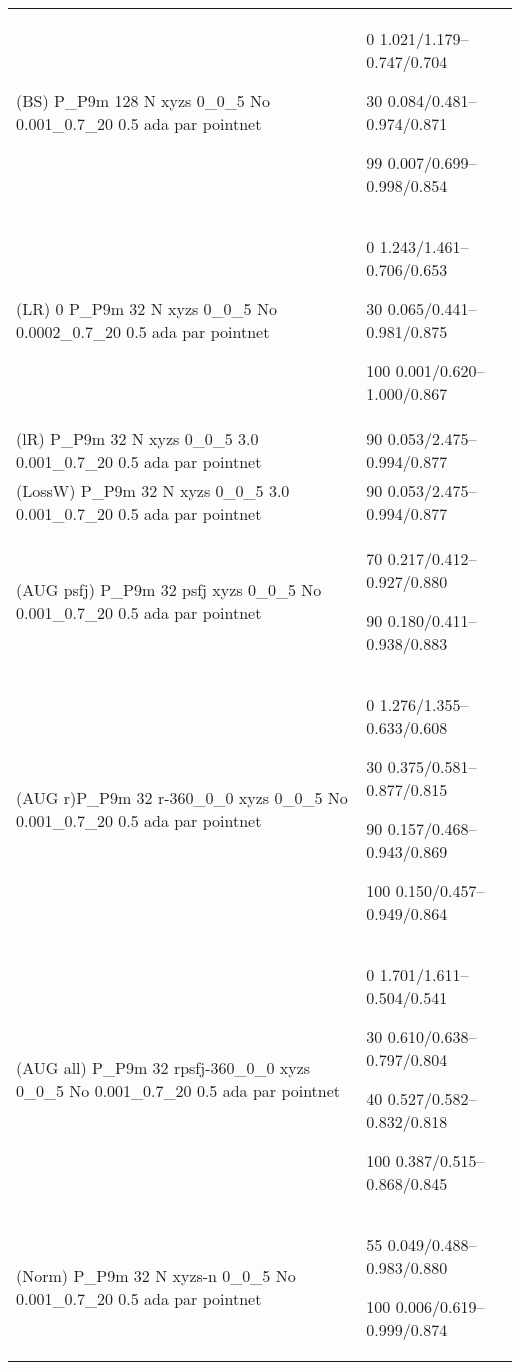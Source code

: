 \documentclass[,table,dvipsnames]{article}
\begin{document}
\begin{tabular}{|p{10cm}|p{5.5cm}| }
\rowcolor{red!20}
(BS)  P\_P9m 128 N xyzs 0\_0\_5 No 0.001\_0.7\_20 0.5 ada par pointnet& 0 1.021/1.179--0.747/0.704\par 30 0.084/0.481--0.974/0.871\par 99 0.007/0.699--0.998/0.854\\

\rowcolor{green!20}
(LR) 0 P\_P9m 32 N xyzs 0\_0\_5 No 0.0002\_0.7\_20 0.5 ada par pointnet& 0 1.243/1.461--0.706/0.653\par 30 0.065/0.441--0.981/0.875\par 100 0.001/0.620--1.000/0.867 \\

\rowcolor{red!20}
(lR) P\_P9m 32 N xyzs 0\_0\_5 3.0 0.001\_0.7\_20 0.5 ada par pointnet& 90 0.053/2.475--0.994/0.877\\

\rowcolor{green!20}
(LossW) P\_P9m 32 N xyzs 0\_0\_5 3.0 0.001\_0.7\_20 0.5 ada par pointnet& 90 0.053/2.475--0.994/0.877\\

\rowcolor{red!20}
(AUG psfj) P\_P9m 32 psfj xyzs 0\_0\_5 No 0.001\_0.7\_20 0.5 ada par pointnet& 70 0.217/0.412--0.927/0.880\par 90 0.180/0.411--0.938/0.883\\

\rowcolor{green!20}
(AUG r)P\_P9m 32 r-360\_0\_0 xyzs 0\_0\_5 No 0.001\_0.7\_20 0.5 ada par pointnet & 0 1.276/1.355--0.633/0.608\par 30 0.375/0.581--0.877/0.815 \par 90 0.157/0.468--0.943/0.869\par 100 0.150/0.457--0.949/0.864\\

\rowcolor{red!20}
(AUG all)  P\_P9m 32 rpsfj-360\_0\_0 xyzs 0\_0\_5 No 0.001\_0.7\_20 0.5 ada par pointnet& 0 1.701/1.611--0.504/0.541\par 30 0.610/0.638--0.797/0.804\par 40 0.527/0.582--0.832/0.818\par 100 0.387/0.515--0.868/0.845\\

\rowcolor{green!20}
(Norm) P\_P9m 32 N xyzs-n 0\_0\_5 No 0.001\_0.7\_20 0.5 ada par pointnet& 55 0.049/0.488--0.983/0.880\par 100 0.006/0.619--0.999/0.874\\

\hline 	
\end{tabular}
\end{document}

